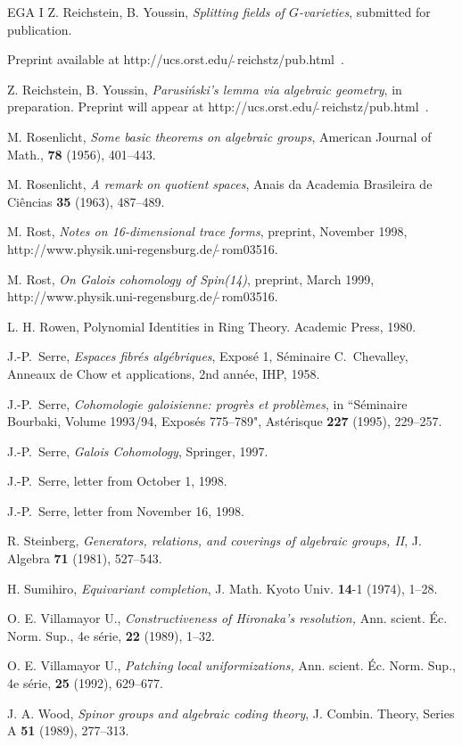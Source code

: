 \begin{thebibliography}{EGA I}
Z. Reichstein, B. Youssin, {\em Splitting fields of
$G$-varieties}, submitted for publication.

Preprint available at
http://ucs.orst.edu/$\tilde{\;}$reichstz/pub.html~.

Z. Reichstein, B. Youssin,
{\em Parusi\'nski's lemma via algebraic geometry}, in preparation.
Preprint will appear at
http://ucs.orst.edu/$\tilde{\;}$reichstz/pub.html~.

M. Rosenlicht, 
{\it Some basic theorems on algebraic groups},
American Journal of Math., {\bf 78} (1956), 401--443.

M. Rosenlicht, {\it A remark on quotient 
spaces}, Anais da Academia Brasileira de Ci\^encias {\bf 35} (1963), 487--489. 

M. Rost, {\em Notes on 16-dimensional trace forms},
preprint, November 1998,
http://www.physik.uni-regensburg.de/$\tilde{\;}$rom03516. 

M. Rost, {\em On Galois cohomology of Spin(14)}, 
preprint, March 1999,
http://www.physik.uni-regensburg.de/$\tilde{\;}$rom03516. 

L. H. Rowen, Polynomial Identities in Ring Theory.
Academic Press, 1980.

J.-P.~Serre, 
{\it Espaces fibr\'{e}s alg\'{e}briques}, 
Expos\'{e} 1, S\'eminaire C.~Chevalley, 
Anneaux de Chow et applications, 2nd ann\'{e}e, IHP, 1958.

J.-P.~Serre, {\it Cohomologie galoisienne: 
progr\`es et probl\`emes}, in ``S\'eminaire Bourbaki, Volume 1993/94,
Expos\'es 775--789", Ast\'erisque {\bf 227} (1995), 229--257.

J.-P.~Serre, {\it Galois Cohomology},
Springer, 1997.

J.-P.~Serre, letter from October 1, 1998.

J.-P.~Serre, letter from November 16, 1998.

R. Steinberg, {\em Generators, relations, and 
coverings of algebraic groups, II}, J. Algebra {\bf 71} (1981), 527--543.  

H. Sumihiro, {\em Equivariant completion},
J. Math. Kyoto Univ. {\bf 14}-1 (1974), 1--28.

 O. E. Villamayor U., {\em Constructiveness of Hironaka's
resolution,} Ann. scient. \'Ec. Norm. Sup., 4e s\'erie, {\bf 22} (1989), 
1--32.

 O. E. Villamayor U., {\em Patching local uniformizations,}
Ann. scient. \'Ec. Norm. Sup., 4e s\'erie, {\bf 25} (1992), 629--677.

J. A. Wood, {\em Spinor groups and algebraic coding theory},
J. Combin. Theory, Series A {\bf 51} (1989), 277--313.
\end{thebibliography}


